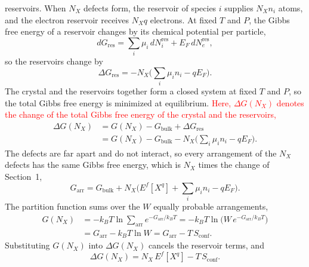 reservoirs. When $N_X$ defects form, the reservoir of species $i$ supplies
$N_Xn_i$ atoms, and the electron reservoir receives $N_Xq$ electrons. At
fixed $T$ and $P$, the Gibbs free energy of a reservoir changes by its
chemical potential per particle,
\begin{equation*}
    dG_{\text{res}}=\sum_i\mu_i\,dN_i^{\text{res}}+E_F\,dN_e^{\text{res}},
\end{equation*}
so the reservoirs change by
\begin{equation*}
    \Delta G_{\text{res}}=-N_X\Big(\sum_i\mu_in_i-qE_F\Big).
\end{equation*}
The crystal and the reservoirs together form a closed system at fixed $T$
and $P$, so the total Gibbs free energy is minimized at equilibrium.
\textcolor{red}{Here, $\Delta G(N_X)$ denotes the change of the total Gibbs
free energy of the crystal and the reservoirs,}
\begin{align*}
    \Delta G(N_X)&=G(N_X)-G_{\text{bulk}}+\Delta G_{\text{res}}\\
    &=G(N_X)-G_{\text{bulk}}-N_X\Big(\sum_i\mu_in_i-qE_F\Big).
\end{align*}
The defects are far apart and do not interact, so every arrangement of the
$N_X$ defects has the same Gibbs free energy, which is $N_X$ times the change
of Section~1,
\begin{equation*}
    G_{\text{arr}}=G_{\text{bulk}}
    +N_X\Big(E^f[X^q]+\sum_i\mu_in_i-qE_F\Big).
\end{equation*}
The partition function sums over the $W$ equally probable arrangements,
\begin{align*}
    G(N_X)&=-k_BT\ln\sum_{\text{arr}}e^{-G_{\text{arr}}/k_BT}
    =-k_BT\ln\big(W\,e^{-G_{\text{arr}}/k_BT}\big)\\
    &=G_{\text{arr}}-k_BT\ln W
    =G_{\text{arr}}-T\,S_{\text{conf}}.
\end{align*}
Substituting $G(N_X)$ into $\Delta G(N_X)$ cancels the reservoir terms, and
\begin{equation}
    \boxed{\Delta G(N_X)=N_X\,E^f[X^q]-T\,S_{\text{conf}}.}
\end{equation}